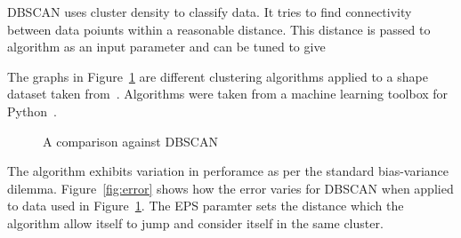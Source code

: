 \documentclass{ecsarticle}     %
\begin{document}
DBSCAN uses cluster density to classify data.
It tries to find connectivity between data poiunts within a reasonable distance.
This distance is passed to algorithm as an input parameter and can be tuned to give

The graphs in Figure~\ref{fig:compare} are different clustering algorithms applied to a shape dataset taken from~\cite{gionis05cluster}. 
Algorithms were taken from a machine learning toolbox for Python~\citep{scikit13ml}. 
\begin{figure}[ht]
   \centering
   \caption{A comparison against DBSCAN}
   \label{fig:compare}
\end{figure}

The algorithm exhibits variation in perforamce as per the standard bias-variance dilemma.
Figure~\ref{fig:error} shows how the error varies for DBSCAN when applied to data used in Figure~\ref{fig:compare}.
The EPS paramter sets the distance which the algorithm allow itself to jump and consider itself in the same cluster.
\end{document}

